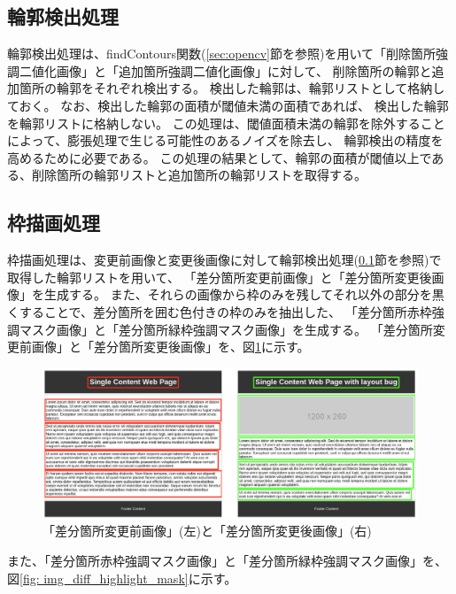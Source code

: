 \subsection{輪郭検出処理}\label{subsec:contour_detection_processing}
輪郭検出処理は、findContours関数(\ref{sec:opencv}節を参照)を用いて「削除箇所強調二値化画像」と「追加箇所強調二値化画像」に対して、
削除箇所の輪郭と追加箇所の輪郭をそれぞれ検出する。
検出した輪郭は、輪郭リストとして格納しておく。
なお、検出した輪郭の面積が閾値未満の面積であれば、
検出した輪郭を輪郭リストに格納しない。
この処理は、閾値面積未満の輪郭を除外することによって、膨張処理で生じる可能性のあるノイズを除去し、
輪郭検出の精度を高めるために必要である。
この処理の結果として、輪郭の面積が閾値以上である、削除箇所の輪郭リストと追加箇所の輪郭リストを取得する。

\subsection{枠描画処理}\label{subsec:Bounding box drawing process}
枠描画処理は、変更前画像と変更後画像に対して輪郭検出処理(\ref{subsec:contour_detection_processing}節を参照)で取得した輪郭リストを用いて、
「差分箇所変更前画像」と「差分箇所変更後画像」を生成する。
また、それらの画像から枠のみを残してそれ以外の部分を黒くすることで、差分箇所を囲む色付きの枠のみを抽出した、
「差分箇所赤枠強調マスク画像」と「差分箇所緑枠強調マスク画像」を生成する。
「差分箇所変更前画像」と「差分箇所変更後画像」を、図\ref{fig: img_diff_highlight}に示す。
\begin{figure}[tp]
    \begin{center}
        \includegraphics[width=1.0\columnwidth]{image/4_img_diff_highlight.png}
        \caption{「差分箇所変更前画像」(左)と「差分箇所変更後画像」(右)}
        \label{fig: img_diff_highlight}
    \end{center}
\end{figure}
また、「差分箇所赤枠強調マスク画像」と「差分箇所緑枠強調マスク画像」を、図\ref{fig: img_diff_highlight_mask}に示す。
